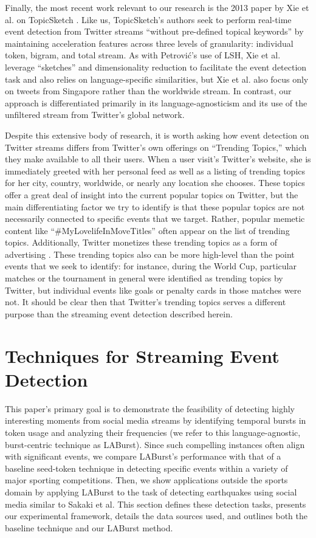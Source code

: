 \documentclass{sig-alternate}
\begin{document}
Finally, the most recent work relevant to our research is the 2013 paper by Xie et al. on TopicSketch \cite{xie2013topicsketch}.
Like us, TopicSketch's authors seek to perform real-time event detection from Twitter streams ``without pre-defined topical keywords'' by maintaining acceleration features across three levels of granularity: individual token, bigram, and total stream.
As with Petrovi\'{c}'s use of LSH, Xie et al. leverage ``sketches'' and dimensionality reduction to facilitate the event detection task and also relies on language-specific similarities, but Xie et al. also focus only on tweets from Singapore rather than the worldwide stream.
In contrast, our approach is differentiated primarily in its language-agnosticism and its use of the unfiltered stream from Twitter's global network.

Despite this extensive body of research, it is worth asking how event detection on Twitter streams differs from Twitter's own offerings on ``Trending Topics,'' which they make available to all their users.
When a user visit's Twitter's website, she is immediately greeted with her personal feed as well as a listing of trending topics for her city, country, worldwide, or nearly any location she chooses.
These topics offer a great deal of insight into the current popular topics on Twitter, but the main differentiating factor we try to identify is that these popular topics are not necessarily connected to specific events that we target.
Rather, popular memetic content like ``\#MyLovelifeInMoveTitles'' often appear on the list of trending topics.
Additionally, Twitter monetizes these trending topics as a form of advertising \cite{Sydell2011}.  
These trending topics also can be more high-level than the point events that we seek to identify: for instance, during the World Cup, particular matches or the tournament in general were identified as trending topics by Twitter, but individual events like goals or penalty cards in those matches were not.
It should be clear then that Twitter's trending topics serves a different purpose than the streaming event detection described herein.

\section{Techniques for Streaming Event Detection}
\label{sect:methods}

This paper's primary goal is to demonstrate the feasibility of detecting highly interesting moments from social media streams by identifying temporal bursts in token usage and analyzing their frequencies (we refer to this language-agnostic, burst-centric technique as LABurst).
Since such compelling instances often align with significant events, we compare LABurst's performance with that of a baseline seed-token technique in detecting specific events within a variety of major sporting competitions.
Then, we show applications outside the sports domain by applying LABurst to the task of detecting earthquakes using social media similar to Sakaki et al.
This section defines these detection tasks, presents our experimental framework, details the data sources used, and outlines both the baseline technique and our LABurst method.
\end{document}
